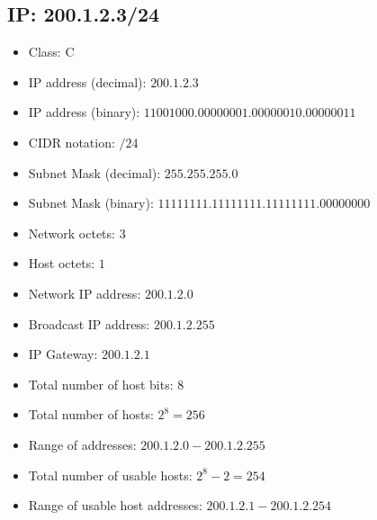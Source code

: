 \documentclass{article}
\begin{document}
\subsection*{IP: 200.1.2.3/24}
  \begin{itemize}
    \item Class: C
    \item IP address (decimal): $200.1.2.3$
    \item IP address (binary): $11001000.00000001.00000010.00000011$
    \item CIDR notation: $/24$
    \item Subnet Mask (decimal): $255.255.255.0$ 
    \item Subnet Mask (binary): $11111111.11111111.11111111.00000000$
    \item Network octets: $3$
    \item Host octets: $1$
    \item Network IP address: $200.1.2.0$
    \item Broadcast IP address: $200.1.2.255$
    \item IP Gateway: $200.1.2.1$
    \item Total number of host bits: $8$
    \item Total number of hosts: $2^{8} = 256$
    \item Range of addresses: $200.1.2.0 - 200.1.2.255$
    \item Total number of usable hosts: $2^{8} - 2 = 254$
    \item Range of usable host addresses: $200.1.2.1 - 200.1.2.254$
  \end{itemize}
\end{document}
